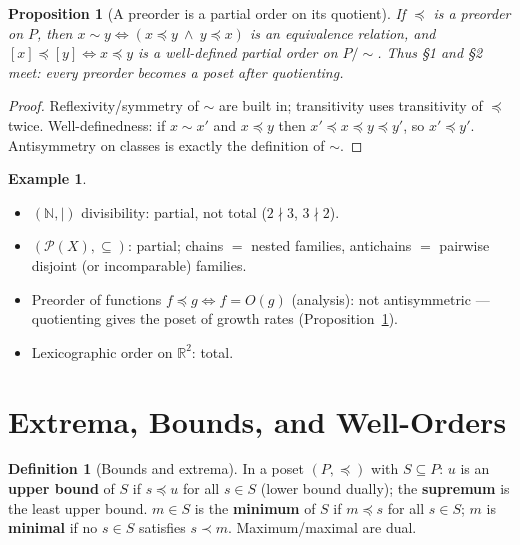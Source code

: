 \documentclass[11pt,a4paper]{article}
\newtheorem{proposition}[theorem]{Proposition}
\theoremstyle{definition}
\newtheorem{definition}[theorem]{Definition}
\newtheorem{example}[theorem]{Example}
\newcommand{\R}{\mathbb{R}}
\newcommand{\N}{\mathbb{N}}
\newcommand{\Pow}{\mathcal{P}}
\begin{document}
\begin{proposition}[A preorder is a partial order on its quotient]\label{prop:preorder-quotient}
If $\preceq$ is a preorder on $P$, then $x\sim y\iff(x\preceq y\ \wedge\ y\preceq x)$ is an
\emph{equivalence relation}, and $[x]\preceq[y]\iff x\preceq y$ is a well-defined \emph{partial order}
on $P/{\sim}$. Thus \S1 and \S2 meet: every preorder becomes a poset after quotienting.
\end{proposition}
\begin{proof}
Reflexivity/symmetry of $\sim$ are built in; transitivity uses transitivity of $\preceq$ twice.
Well-definedness: if $x\sim x'$ and $x\preceq y$ then $x'\preceq x\preceq y\preceq y'$, so
$x'\preceq y'$. Antisymmetry on classes is exactly the definition of $\sim$.
\end{proof}

\begin{example}\label{ex:orders}
\begin{itemize}
  \item $(\N,\mid)$ divisibility: partial, not total ($2\nmid 3$, $3\nmid 2$).
  \item $(\Pow(X),\subseteq)$: partial; chains $=$ nested families, antichains $=$ pairwise disjoint (or incomparable) families.
  \item Preorder of functions $f\preceq g\iff f=O(g)$ (analysis): not antisymmetric --- quotienting gives the poset of growth rates (Proposition~\ref{prop:preorder-quotient}).
  \item Lexicographic order on $\R^2$: total.
\end{itemize}
\end{example}

\section{Extrema, Bounds, and Well-Orders}

\begin{definition}[Bounds and extrema]
In a poset $(P,\preceq)$ with $S\subseteq P$: $u$ is an \textbf{upper bound} of $S$ if $s\preceq u$
for all $s\in S$ (lower bound dually); the \textbf{supremum} is the least upper bound.
$m\in S$ is the \textbf{minimum} of $S$ if $m\preceq s$ for all $s\in S$; $m$ is \textbf{minimal} if
no $s\in S$ satisfies $s\prec m$. Maximum/maximal are dual.
\end{definition}
\end{document}
